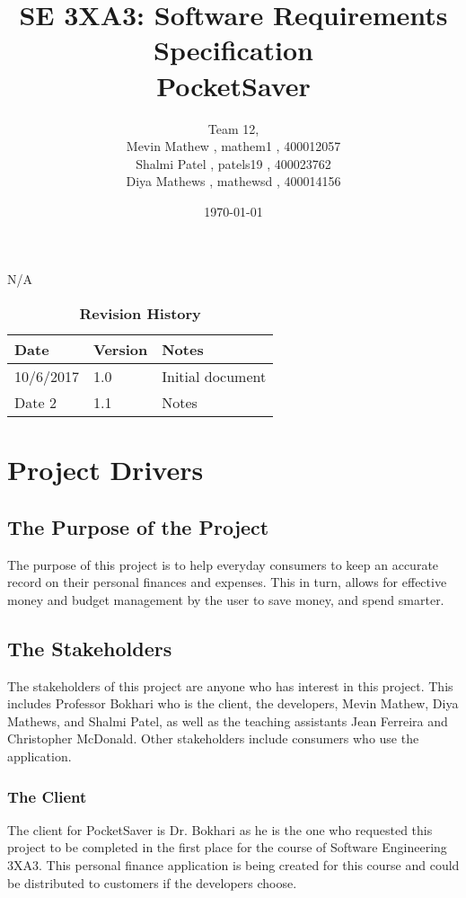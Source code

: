 \documentclass[12pt, titlepage]{article}
\title{SE 3XA3: Software Requirements Specification\\PocketSaver}
\author{Team 12, 
		\\ Mevin Mathew , mathem1 , 400012057
		\\ Shalmi Patel , patels19 , 400023762
		\\ Diya Mathews , mathewsd , 400014156
}
\date{\today}
\begin{document}
\maketitle

\tableofcontents
\listoftables
\listoffigures
N/A


\begin{table}[bp]
\caption{\bf Revision History}
\begin{tabularx}{\textwidth}{p{3cm}p{2cm}X}
\toprule {\bf Date} & {\bf Version} & {\bf Notes}\\
\midrule
10/6/2017 & 1.0 & Initial document\\
Date 2 & 1.1 & Notes\\
\bottomrule
\end{tabularx}
\end{table}

\newpage



\section{Project Drivers}

\subsection{The Purpose of the Project}
The purpose of this project is to help everyday consumers to keep an accurate record on their personal finances and expenses. This in turn, allows for effective money and budget management by the user to save money, and spend smarter. 
\subsection{The Stakeholders}
The stakeholders of this project are anyone who has interest in this project. This includes Professor Bokhari who is the client, the developers, Mevin Mathew, Diya Mathews, and Shalmi Patel, as well as the teaching assistants Jean Ferreira and Christopher McDonald. Other stakeholders include consumers who use the application.
\subsubsection{The Client}
The client for PocketSaver is Dr. Bokhari  as he is the one who requested this project to be completed in the first place for the course of Software Engineering 3XA3. This personal finance application is being created for this course and could be distributed to customers if the developers choose.
\end{document}
